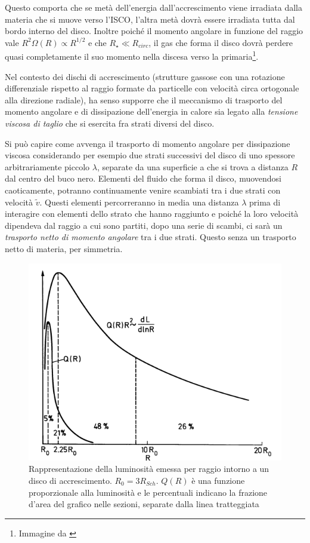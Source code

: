 \documentclass[a4paperbi]{article}
\begin{document}
	Questo comporta che se metà dell'energia dall'accrescimento viene irradiata dalla materia che si muove verso l'ISCO, l'altra metà dovrà essere irradiata tutta dal bordo interno del disco. Inoltre poiché il momento angolare in funzione del raggio vale $R^2\Omega(R)\propto R^{1/2}$ e che $R_{\star}\ll R_{circ}$, il gas che forma il disco dovrà perdere quasi completamente il suo momento nella discesa verso la primaria\footnote{Immagine da \cite{ShakuraSunyaev1973}}.	
	
	Nel contesto dei dischi di accrescimento (strutture gassose con una rotazione differenziale rispetto al raggio formate da particelle con velocità circa ortogonale alla direzione radiale), ha senso supporre che il meccanismo di trasporto del momento angolare e di dissipazione dell'energia in calore sia legato alla \textit{tensione viscosa di taglio} che si esercita fra strati diversi del disco.	

	Si può capire come avvenga il trasporto di momento angolare per dissipazione viscosa considerando per esempio due strati successivi del disco di uno spessore arbitrariamente piccolo $\lambda$, separate da una superficie a che si trova a distanza $R$ dal centro del buco nero. Elementi del fluido che forma il disco, muovendosi caoticamente, potranno continuamente venire scambiati tra i due strati con velocità $\tilde{v}$. Questi elementi percorreranno in media una distanza $\lambda$ prima di interagire con elementi dello strato che hanno raggiunto e poiché la loro velocità dipendeva dal raggio a cui sono partiti, dopo una serie di scambi, ci sarà un \textit{trasporto netto di momento angolare} tra i due strati. Questo senza un trasporto netto di materia, per simmetria.

	\begin{figure}[H]
		\centering
		\includegraphics[width=0.8\linewidth]{LuminositaRaggio}
		\caption{Rappresentazione della luminosità emessa per raggio intorno a un disco di accrescimento. $R_0=3R_{Sch}$. $Q(R)$ è una funzione proporzionale alla luminosità e le percentuali indicano la frazione d'area del grafico nelle sezioni, separate dalla linea tratteggiata}
		\label{fig:LuminositaRaggio}
	\end{figure}
\end{document}
